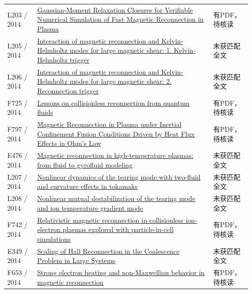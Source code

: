 \documentclass[UTF8,a4paper,11pt,openany,fontset=fandol]{ctexbook}
\begin{document}
\begin{longtable}{P{24mm}P{97mm}P{27mm}}
L203 / 2014 & \href{https://doi.org/10.48550/arxiv.1409.6985}{Gaussian-Moment Relaxation Closures for Verifiable Numerical Simulation of Fast Magnetic Reconnection in Plasma} & 有PDF，待核读\\

L205 / 2014 & \href{https://doi.org/10.1002/2013ja019224}{Interaction of magnetic reconnection and Kelvin‐Helmholtz modes for large magnetic shear: 1. Kelvin‐Helmholtz trigger} & 未获匹配全文\\

L206 / 2014 & \href{https://doi.org/10.1002/2013ja019225}{Interaction of magnetic reconnection and Kelvin‐Helmholtz modes for large magnetic shear: 2. Reconnection trigger} & 未获匹配全文\\

F725 / 2014 & \href{https://doi.org/10.3389/fphy.2014.00076}{Lessons on collisionless reconnection from quantum fluids} & 有PDF，待核读\\

F797 / 2014 & \href{https://doi.org/10.1103/physrevlett.112.105004}{Magnetic Reconnection in Plasma under Inertial Confinement Fusion Conditions Driven by Heat Flux Effects in Ohm’s Law} & 有PDF，待核读\\

E476 / 2014 & \href{http://hdl.handle.net/11583/2536090}{Magnetic reconnection in high-temperature plasmas: from fluid to gyrofluid modeling} & 未获匹配全文\\

L207 / 2014 & \href{https://doi.org/10.1063/1.4863498}{Nonlinear dynamics of the tearing mode with two-fluid and curvature effects in tokamaks} & 未获匹配全文\\

L208 / 2014 & \href{https://doi.org/10.1088/0029-5515/54/12/123018}{Nonlinear mutual destabilization of the tearing mode and ion temperature gradient mode} & 未获匹配全文\\

F742 / 2014 & \href{https://doi.org/10.1051/0004-6361/201424083}{Relativistic magnetic reconnection in collisionless ion-electron plasmas explored with particle-in-cell simulations} & 有PDF，待核读\\

E349 / 2014 & \href{http://absimage.aps.org/image/DPP14/MWS_DPP14-2014-001290.pdf}{Scaling of Hall Reconnection in the Coalescence Problem in Large Systems} & 未获匹配全文\\

F653 / 2014 & \href{https://doi.org/10.1186/bf03353282}{Strong electron heating and non-Maxwellian behavior in magnetic reconnection} & 有PDF，待核读\\


\end{longtable}
\end{document}
